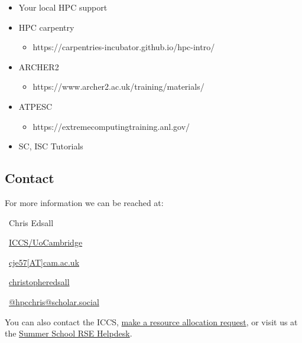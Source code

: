 \documentclass[
  letterpaper,
  DIV=11,
  numbers=noendperiod]{scrartcl}
\providecommand{\tightlist}{%
  \setlength{\itemsep}{0pt}\setlength{\parskip}{0pt}}
\begin{document}
\begin{itemize}
\tightlist
\item
  Your local HPC support
\item
  HPC carpentry

  \begin{itemize}
  \tightlist
  \item
    https://carpentries-incubator.github.io/hpc-intro/
  \end{itemize}
\item
  ARCHER2

  \begin{itemize}
  \tightlist
  \item
    https://www.archer2.ac.uk/training/materials/
  \end{itemize}
\item
  ATPESC

  \begin{itemize}
  \tightlist
  \item
    https://extremecomputingtraining.anl.gov/
  \end{itemize}
\item
  SC, ISC Tutorials
\end{itemize}

\subsection{Contact}\label{contact}

For more information we can be reached at:

 ~Chris Edsall

~\href{https://iccs.cam.ac.uk/about-us/our-team}{ICCS/UoCambridge}

 ~\href{mailto:cje57@cam.ac.uk}{cje57{[}AT{]}cam.ac.uk}

~\href{https://github.com/christopheredsall}{christopheredsall}

~\href{https://scholar.social/@hpcchris}{@hpcchris@scholar.social}

You can also contact the ICCS,
\href{https://iccs.cam.ac.uk/resources-vesri-members/resource-allocation-process}{make
a resource allocation request}, or visit us at the
\href{https://docs.google.com/spreadsheets/d/1v8y2GodI9JZoHrFRpLW2tD135MurDBMIcr-ArBFIT3A}{Summer
School RSE Helpdesk}.
\end{document}
